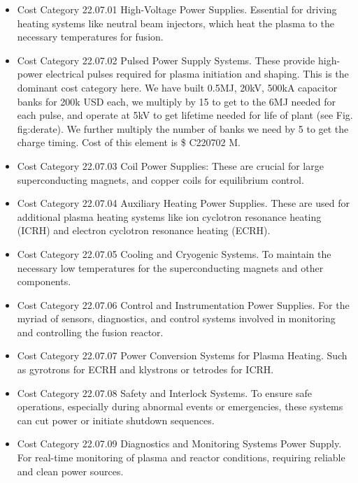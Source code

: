 \begin{itemize}
    \item Cost Category 22.07.01 High-Voltage Power Supplies. Essential for driving heating systems like neutral beam injectors, which heat the plasma to the necessary temperatures for fusion.
    \item Cost Category 22.07.02 Pulsed Power Supply Systems. These provide high-power electrical pulses required for plasma initiation and shaping.  This is the dominant cost category here.  We have built 0.5MJ, 20kV, 500kA capacitor banks for 200k USD each, we multiply by 15 to get to the 6MJ needed for each pulse, and operate at 5kV to get lifetime needed for life of plant (see Fig. fig:derate).  We further multiply the number of banks we need by 5 to get the charge timing.  Cost of this element is \$ C220702 M.


    \item Cost Category 22.07.03 Coil Power Supplies: These are crucial for large superconducting magnets, and copper coils for equilibrium control.
    \item Cost Category 22.07.04 Auxiliary Heating Power Supplies. These are used for additional plasma heating systems like ion cyclotron resonance heating (ICRH) and electron cyclotron resonance heating (ECRH).
    \item Cost Category 22.07.05 Cooling and Cryogenic Systems. To maintain the necessary low temperatures for the superconducting magnets and other components.
    \item Cost Category 22.07.06 Control and Instrumentation Power Supplies. For the myriad of sensors, diagnostics, and control systems involved in monitoring and controlling the fusion reactor.
    \item Cost Category 22.07.07 Power Conversion Systems for Plasma Heating. Such as gyrotrons for ECRH and klystrons or tetrodes for ICRH.
    \item Cost Category 22.07.08 Safety and Interlock Systems. To ensure safe operations, especially during abnormal events or emergencies, these systems can cut power or initiate shutdown sequences.
    \item Cost Category  22.07.09 Diagnostics and Monitoring Systems Power Supply. For real-time monitoring of plasma and reactor conditions, requiring reliable and clean power sources.
\end{itemize}


